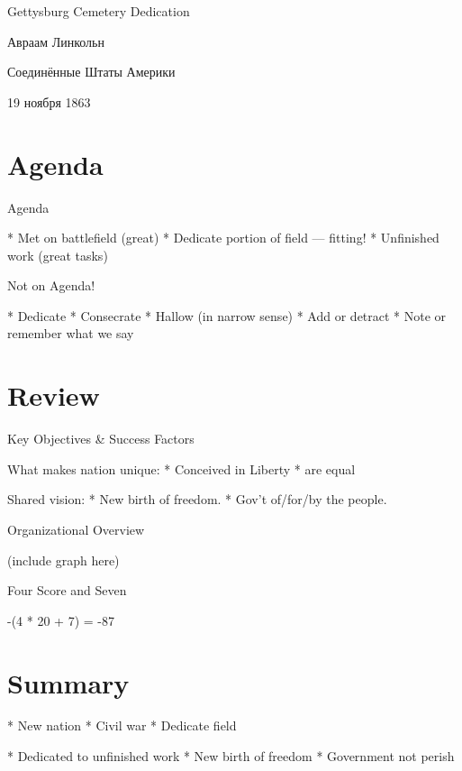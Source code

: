 \documentclass{beamer}
\begin{document}
Gettysburg Cemetery Dedication

Авраам Линкольн

Соединённые Штаты Америки

19 ноября 1863

\section{Agenda}

Agenda

  * Met on battlefield (great)
  * Dedicate portion of field --- fitting!
  * Unfinished work (great tasks)

Not on Agenda!

  * Dedicate
  * Consecrate
  * Hallow (in narrow sense)
  * Add or detract
  * Note or remember what we say

\section{Review}

Key Objectives \& Success Factors

What makes nation unique:
  * Conceived in Liberty
  * are equal

Shared vision:
  * New birth of freedom.
  * Gov't of/for/by the people.

Organizational Overview

(include graph here)

Four Score and Seven

-(4 * 20 + 7) = -87

\section{Summary}

* New nation
* Civil war
* Dedicate field

* Dedicated to unfinished work
* New birth of freedom
* Government not perish
\end{document}
